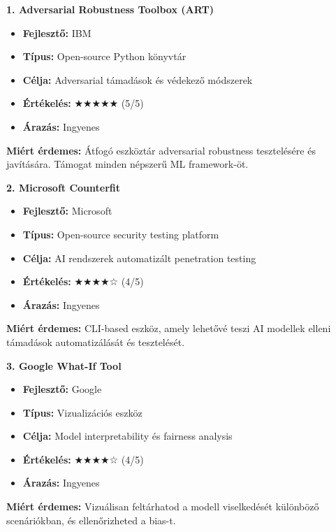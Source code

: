 \documentclass{../templates/magazine}
\begin{document}
\textbf{1. Adversarial Robustness Toolbox (ART)}
\begin{itemize}
    \item \textbf{Fejlesztő:} IBM
    \item \textbf{Típus:} Open-source Python könyvtár
    \item \textbf{Célja:} Adversarial támadások és védekező módszerek
    \item \textbf{Értékelés:} ★★★★★ (5/5)
    \item \textbf{Árazás:} Ingyenes
\end{itemize}

\textbf{Miért érdemes:} Átfogó eszköztár adversarial robustness tesztelésére és javítására. Támogat minden népszerű ML framework-öt.

\vspace{0.5cm}

\textbf{2. Microsoft Counterfit}
\begin{itemize}
    \item \textbf{Fejlesztő:} Microsoft
    \item \textbf{Típus:} Open-source security testing platform
    \item \textbf{Célja:} AI rendszerek automatizált penetration testing
    \item \textbf{Értékelés:} ★★★★☆ (4/5)
    \item \textbf{Árazás:} Ingyenes
\end{itemize}

\textbf{Miért érdemes:} CLI-based eszköz, amely lehetővé teszi AI modellek elleni támadások automatizálását és tesztelését.

\vspace{0.5cm}

\textbf{3. Google What-If Tool}
\begin{itemize}
    \item \textbf{Fejlesztő:} Google
    \item \textbf{Típus:} Vizualizációs eszköz
    \item \textbf{Célja:} Model interpretability és fairness analysis
    \item \textbf{Értékelés:} ★★★★☆ (4/5)
    \item \textbf{Árazás:} Ingyenes
\end{itemize}

\textbf{Miért érdemes:} Vizuálisan feltárhatod a modell viselkedését különböző scenáriókban, és ellenőrizheted a bias-t.

\vspace{0.5cm}
\end{document}
